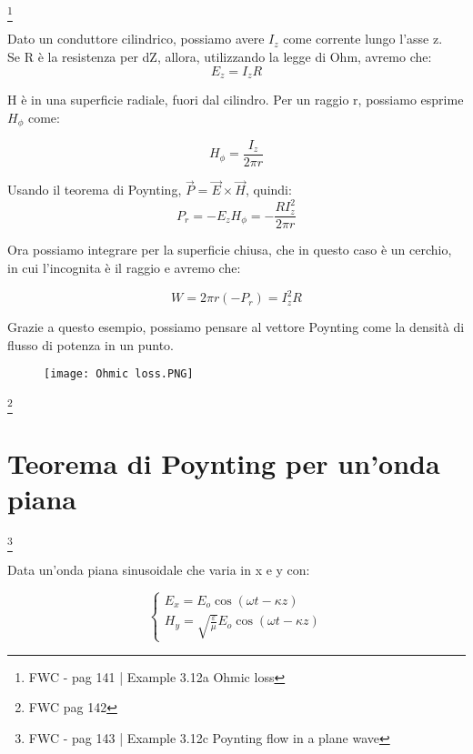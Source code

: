 \footnote{ FWC - pag 141 | Example 3.12a Ohmic loss} 

Dato un conduttore cilindrico, possiamo avere $I_z$ come corrente lungo l'asse z. \\ 
Se R è la resistenza per dZ, allora, utilizzando la legge di Ohm, avremo che: 
{
    \Large
    \begin{equation}
    E_z = I_z R     
    \end{equation}
}

H è in una superficie radiale, fuori dal cilindro. Per un raggio r, possiamo esprime $H_\phi$ come: 

{
    \Large
    \begin{equation}
    H_\phi = \frac{I_z}{2\pi r}     
    \end{equation}
}

Usando il teorema di Poynting, $\vec{P} = \vec{E} \times \vec{H}$, quindi: 
{
    \Large
    \begin{equation}
    P_r = -E_z H_\phi = - \frac{R I_z^{2}}{2\pi r}        
    \end{equation}
}

Ora possiamo integrare per la superficie chiusa, che in questo caso è un cerchio, in cui l'incognita è 
il raggio e avremo che: 

{
    \Large
    \begin{equation}
    W = 2\pi r (-P_r) = I_z ^{2} R        
    \end{equation}
}

Grazie a questo esempio, possiamo pensare al vettore Poynting come la densità 
di flusso di potenza in un punto.  

\begin{figure}[h]
    \centering 
    \texttt{[image: Ohmic loss.PNG]} 
    
\end{figure}  

\footnote{FWC pag 142 } 

\newpage 

\section{Teorema di Poynting per un'onda piana}

\footnote{FWC - pag 143 | Example 3.12c Poynting flow in a plane wave} 

Data un'onda piana sinusoidale che varia in x e y con: 

{
    \Large
    \begin{equation}
        \begin{cases}
            E_x = E_o \cos(\omega t - \kappa z) \\
            H_y = \sqrt{\frac{\varepsilon}{\mu}} E_o \cos(\omega t - \kappa z)                         
        \end{cases}
    \end{equation}
}

